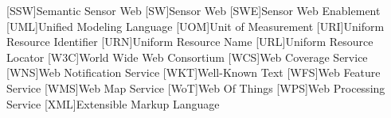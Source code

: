 \begin{acronym}[UML]
  [SSW]{Semantic Sensor Web}
  [SW]{Sensor Web}
  [SWE]{Sensor Web Enablement}
  [UML]{Unified Modeling Language}
  [UOM]{Unit of Measurement}
  [URI]{Uniform Resource Identifier}
  [URN]{Uniform Resource Name}
  [URL]{Uniform Resource Locator}
  [W3C]{World Wide Web Consortium}
  [WCS]{Web Coverage Service}
  [WNS]{Web Notification Service}
  [WKT]{Well-Known Text}
  [WFS]{Web Feature Service}
  [WMS]{Web Map Service}
  [WoT]{Web Of Things}
  [WPS]{Web Processing Service}
  [XML]{Extensible Markup Language}
\end{acronym}